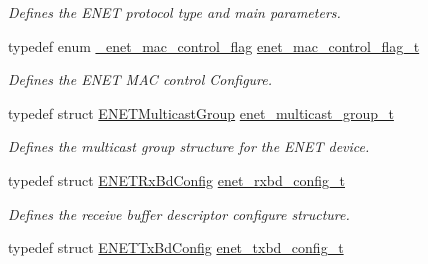 \begin{DoxyCompactItemize}
\begin{DoxyCompactList}\small\item\em Defines the E\+N\+ET protocol type and main parameters. \end{DoxyCompactList}\item 
typedef enum \hyperlink{group__enet__driver_gaa3e05d2b5f1ccb46819bc1129fe03873}{\+\_\+enet\+\_\+mac\+\_\+control\+\_\+flag} \hyperlink{group__enet__driver_ga52ac90b3ae17665098f209e3adbde200}{enet\+\_\+mac\+\_\+control\+\_\+flag\+\_\+t}\hypertarget{group__enet__driver_ga52ac90b3ae17665098f209e3adbde200}{}\label{group__enet__driver_ga52ac90b3ae17665098f209e3adbde200}

\begin{DoxyCompactList}\small\item\em Defines the E\+N\+ET M\+AC control Configure. \end{DoxyCompactList}\item 
typedef struct \hyperlink{structENETMulticastGroup}{E\+N\+E\+T\+Multicast\+Group} \hyperlink{group__enet__driver_ga0f85fe28ec946c36acd9856e9f70799a}{enet\+\_\+multicast\+\_\+group\+\_\+t}\hypertarget{group__enet__driver_ga0f85fe28ec946c36acd9856e9f70799a}{}\label{group__enet__driver_ga0f85fe28ec946c36acd9856e9f70799a}

\begin{DoxyCompactList}\small\item\em Defines the multicast group structure for the E\+N\+ET device. \end{DoxyCompactList}\item 
typedef struct \hyperlink{structENETRxBdConfig}{E\+N\+E\+T\+Rx\+Bd\+Config} \hyperlink{group__enet__driver_gab090bee9d2d43fafd258c5cf9db43405}{enet\+\_\+rxbd\+\_\+config\+\_\+t}\hypertarget{group__enet__driver_gab090bee9d2d43fafd258c5cf9db43405}{}\label{group__enet__driver_gab090bee9d2d43fafd258c5cf9db43405}

\begin{DoxyCompactList}\small\item\em Defines the receive buffer descriptor configure structure. \end{DoxyCompactList}\item 
typedef struct \hyperlink{structENETTxBdConfig}{E\+N\+E\+T\+Tx\+Bd\+Config} \hyperlink{group__enet__driver_gaa9b0e870936a3a951241a0d2d95e22cd}{enet\+\_\+txbd\+\_\+config\+\_\+t}\hypertarget{group__enet__driver_gaa9b0e870936a3a951241a0d2d95e22cd}{}\label{group__enet__driver_gaa9b0e870936a3a951241a0d2d95e22cd}


\end{DoxyCompactItemize}
